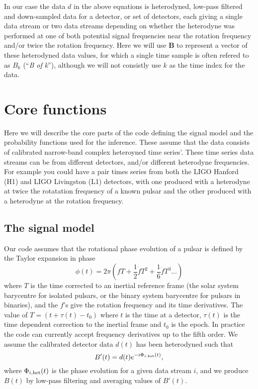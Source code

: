 \documentclass[aps,prd,showpacs,superscriptaddress,twocolumn,preprintnumbers,altaffilletter]{revtex4-1}
\begin{document}
In our case the data $d$ in the above equations is heterodyned, low-pass filtered and down-sampled data
for a detector, or set of detectors, each giving a single data stream or two data streams depending on
whether the heterodyne was performed at one of both potential signal frequencies near the rotation frequency
and/or twice the rotation frequency. Here we will use $\mathbf{B}$ to represent a vector of these heterodyned
data values, for which a single time sample is often refered to as $B_k$ (``{\it B of k}''), although we will
not consistly use $k$ as the time index for the data.

\section{Core functions}

Here we will describe the core parts of the code defining the signal model and the probability functions used
for the inference. These assume that the data consists of calibrated narrow-band complex heteroyned time
series'. These time series data streams can be from different detectors, and/or different heterodyne
frequencies. For example you could have a pair times series from both the LIGO Hanford (H1) and LIGO
Livingston (L1) detectors, with one produced with a heterodyne at twice the rotatation frequency of a known
pulsar and the other produced with a heterodyne at the rotation frequency.

\subsection{The signal model}

Our code assumes that the rotational phase evolution of a pulsar is defined by the Taylor expansion in phase
\begin{equation}
\phi(t) = 2\pi\left(fT + \frac{1}{2}\dot{f}T^2 + \frac{1}{6}\ddot{f}T^3  \ldots\right)
\end{equation}
where $T$ is the time corrected to an inertial reference frame (the solar system barycentre
for isolated pulsars, or the binary system barycentre for pulsars in binaries), and the $f$'s give
the rotation frequency and its time derivatives. The value of $T = (t+\tau(t)-t_0)$ where $t$ is the
time at a detector, $\tau(t)$ is the time dependent correction to the inertial frame and $t_0$ is the epoch.
In practice the code can currently accept frequency derivatives up to the fifth order. We assume the
calibrated detector data $d(t)$ has been heterodyned such that
\begin{equation}
B'(t) = d(t)e^{-i\Phi_{i,\rm het}(t)},
\end{equation}
where $\Phi_{i,\rm het}(t)$ is the phase evolution for a given data stream $i$, and we produce $B(t)$ by
low-pass filtering and averaging values of $B'(t)$.
\end{document}
